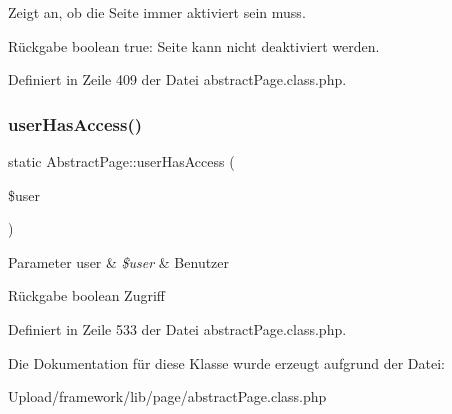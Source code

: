 Zeigt an, ob die Seite immer aktiviert sein muss. \begin{DoxyReturn}{Rückgabe}
boolean true\+: Seite kann nicht deaktiviert werden. 
\end{DoxyReturn}


Definiert in Zeile 409 der Datei abstract\+Page.\+class.\+php.

\mbox{\label{class_abstract_page_ae980229e15fcb3d471ae90bbb10f6d9d}} 
\subsubsection{\texorpdfstring{user\+Has\+Access()}{userHasAccess()}}
{\footnotesize\ttfamily static Abstract\+Page\+::user\+Has\+Access (\begin{DoxyParamCaption}\item[{}]{\$user }\end{DoxyParamCaption})\hspace{0.3cm}{\ttfamily [static]}}


\begin{DoxyParams}[1]{Parameter}
user & {\em \$user} & Benutzer \\
\hline
\end{DoxyParams}
\begin{DoxyReturn}{Rückgabe}
boolean Zugriff 
\end{DoxyReturn}


Definiert in Zeile 533 der Datei abstract\+Page.\+class.\+php.



Die Dokumentation für diese Klasse wurde erzeugt aufgrund der Datei\+:\begin{DoxyCompactItemize}
\item 
Upload/framework/lib/page/abstract\+Page.\+class.\+php\end{DoxyCompactItemize}
